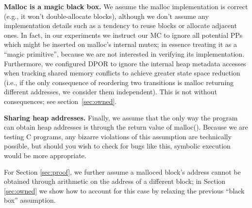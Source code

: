 {\bf Malloc is a magic black box.}
We assume the malloc implementation is correct (e.g., it won't double-allocate blocks), although we don't assume any implementation details such as a tendency to reuse blocks or allocate adjacent ones.
In fact, in our experiments we instruct our MC to ignore all potential PPs which might be inserted on malloc's internal mutex;
in essence treating it as a ``magic primitive'', because we are not interested in verifying its implementation.
Furthermore, we configured DPOR to ignore the internal heap metadata accesses
when tracking shared memory conflicts to achieve greater state space reduction
(i.e., if the only consequence of reordering two transitions is malloc returning different addresses, we consider them independent).
This is not without consequences; see section~\ref{sec:owned}.

{\bf Sharing heap addresses.}
Finally, we assume that the only way the program can obtain heap addresses is through the return value of malloc().
Because we are testing C programs, any bizarre violations of this assumption are technically possible,
but should you wish to check for bugs like this,
symbolic execution \cite{klee} would be more appropriate.

For Section \ref{sec:proof}, we further assume a malloced block's address cannot be obtained through arithmetic on the address of a different block; in Section \ref{sec:owned} we show how to account for this case by relaxing the previous ``black box'' assumption.

